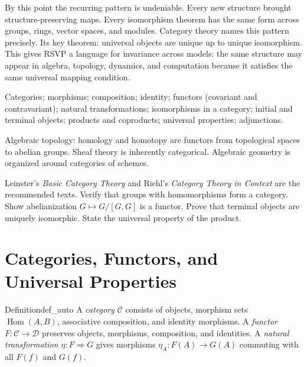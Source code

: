 \documentclass[12pt, twoside, openright, a4paper]{book}
\newcommand{\Hom}{\operatorname{Hom}}
\begin{document}
\begin{motivation}
By this point the recurring pattern is undeniable.
Every new structure brought structure-preserving maps.
Every isomorphism theorem has the same form across groups, rings, vector spaces, and modules.
Category theory names this pattern precisely.
Its key theorem: universal objects are unique up to unique isomorphism.
This gives RSVP a language for invariance across models: the same structure may appear in algebra, topology, dynamics, and computation because it satisfies the same universal mapping condition.
\end{motivation}

\begin{structures}
Categories; morphisms; composition; identity; functors (covariant and contravariant); natural transformations; isomorphisms in a category; initial and terminal objects; products and coproducts; universal properties; adjunctions.
\end{structures}

\begin{dependencies}
Algebraic topology: homology and homotopy are functors from topological spaces to abelian groups.
Sheaf theory is inherently categorical.
Algebraic geometry is organized around categories of schemes.
\end{dependencies}

\begin{exercises_box}
Leinster's \textit{Basic Category Theory} and Riehl's \textit{Category Theory in Context} are the recommended texts.
Verify that groups with homomorphisms form a category.
Show abelianization $G \mapsto G/[G,G]$ is a functor.
Prove that terminal objects are uniquely isomorphic.
State the universal property of the product.
\end{exercises_box}

\section{Categories, Functors, and Universal Properties}

\begin{definition}{Definition}{def_auto}
A \emph{category} $\mathcal{C}$ consists of objects, morphism sets $\Hom(A,B)$, associative composition, and identity morphisms.
A \emph{functor} $F: \mathcal{C} \to \mathcal{D}$ preserves objects, morphisms, composition, and identities.
A \emph{natural transformation} $\eta: F \Rightarrow G$ gives morphisms $\eta_A: F(A) \to G(A)$ commuting with all $F(f)$ and $G(f)$.
\end{definition}
\end{document}
